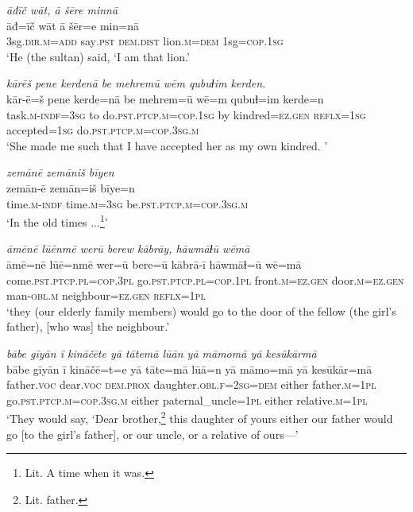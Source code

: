 \ea \label{ŽH.116}
\textit{āđīč wāt, ā šēre minnā} \\ 
\gll āđ=īč wāt ā šēr=e min=nā \\ 
 3sg\textsc{.dir}\textsc{.m}\textsc{=add} say\textsc{.pst} \textsc{dem.dist} lion\textsc{.m}\textsc{=dem} 1sg\textsc{=cop}\textsc{.1sg} \\ 
\glt `He (the sultan) said, ‘I am that lion.'
\z 
 
\ea \label{ŽH.117}
\textit{kārēš pene kerdenā be mehremū wēm qubuɫim kerden.} \\ 
\gll kār-ē=š pene kerde=nā be mehrem=ū wē=m qubuɫ=im kerde=n \\ 
 task\textsc{.m}\textsc{-indf}\textsc{=3sg} to do\textsc{.pst}\textsc{.ptcp}\textsc{.m}\textsc{=cop}\textsc{.1sg} by kindred\textsc{=ez}\textsc{.gen} \textsc{reflx}\textsc{=1sg} accepted\textsc{=1sg} do\textsc{.pst}\textsc{.ptcp}\textsc{.m}\textsc{=cop}\textsc{.3sg}\textsc{.m} \\ 
\glt `She made  me such that I have accepted her as my own kindred. '
\z 
 
\ea \label{RE.1}
\textit{zemānē zemāniš bīyen} \\ 
\gll zemān-ē zemān=iš bīye=n \\ 
 time\textsc{.m}\textsc{-indf} time\textsc{.m}\textsc{=3sg} be\textsc{.pst}\textsc{.ptcp}\textsc{.m}\textsc{=cop}\textsc{.3sg}\textsc{.m} \\ 
\glt `In the old times ...\footnote{Lit. A time when it was.}'
\z 
 
\ea \label{RE.3}
\textit{āmēnē lūēnmē werū berew kābrāy, hāwmāɫū wēmā} \\ 
\gll āmē=nē lūē=nmē wer=ū bere=ū kābrā-ī hāwmāɫ=ū wē=mā \\ 
 come\textsc{.pst}\textsc{.ptcp}\textsc{.pl}\textsc{=cop}\textsc{.3pl} go\textsc{.pst}\textsc{.ptcp}\textsc{.pl}\textsc{=cop}\textsc{.\textsc{1pl}} front\textsc{.m}\textsc{\textsc{=ez.gen}} door\textsc{.m}\textsc{\textsc{=ez.gen}} man\textsc{-obl}\textsc{.m} neighbour\textsc{\textsc{=ez.gen}} \textsc{reflx}\textsc{=\textsc{1pl}} \\ 
\glt `they (our elderly family members) would go to the door of the fellow (the girl’s father), [who was] the neighbour.'
\z 
 
\ea \label{RE.4}
\textit{bābe gīyān ī kināčēte yā tātemā lūān yā māmomā yā kesūkārmā} \\ 
\gll bābe gīyān ī kināčē=t=e yā tāte=mā lūā=n yā māmo=mā yā kesūkār=mā \\ 
 father.\textsc{voc} dear.\textsc{voc} \textsc{dem.prox} daughter\textsc{.obl}\textsc{.f}\textsc{=\textsc{2sg}}\textsc{=dem} either father\textsc{.m}\textsc{=\textsc{1pl}} go\textsc{.pst}\textsc{.ptcp}\textsc{.m}\textsc{=cop}\textsc{.3sg}\textsc{.m} either paternal\_uncle\textsc{=\textsc{1pl}} either relative\textsc{.m}\textsc{=\textsc{1pl}} \\ 
\glt `They would say, ‘Dear brother,\footnote{Lit. father.} this daughter of yours \—either our father would go [to the girl’s father], or our uncle, or a relative of ours—'
\z 
 

